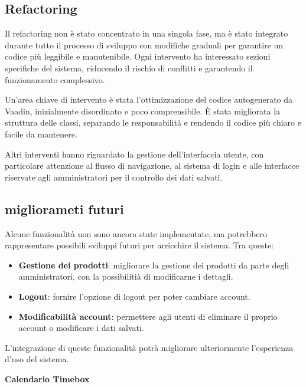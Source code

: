 \documentclass[a4paper,12pt]{article}
\begin{document}
\subsection{Refactoring}
Il refactoring non è stato concentrato in una singola fase, ma è stato integrato durante tutto il processo di sviluppo con modifiche graduali per garantire un codice più leggibile e manutenibile. Ogni intervento ha interessato sezioni specifiche del sistema, riducendo il rischio di conflitti e garantendo il funzionamento complessivo.

Un'area chiave di intervento è stata l'ottimizzazione del codice autogenerato da Vaadin, inizialmente disordinato e poco comprensibile. È stata migliorata la struttura delle classi, separando le responsabilità e rendendo il codice più chiaro e facile da mantenere.

Altri interventi hanno riguardato la gestione dell’interfaccia utente, con particolare attenzione al flusso di navigazione, al sistema di login e alle interfacce riservate agli amministratori per il controllo dei dati salvati.
\subsection{migliorameti futuri}
Alcune funzionalità non sono ancora state implementate, ma potrebbero rappresentare possibili sviluppi futuri per arricchire il sistema. Tra queste:

\begin{itemize}
    \item \textbf{Gestione dei prodotti}: migliorare la gestione dei prodotti da parte degli amministratori, con la possibilitià di modificarne i dettagli.
    \item \textbf{Logout}: fornire l'opzione di logout per poter cambiare account.
    \item \textbf{Modificabilità account}: permettere agli utenti di eliminare il proprio account o modificare i dati salvati.
\end{itemize}
L'integrazione di queste funzionalità potrà migliorare ulteriormente l'esperienza d'uso del sistema.
\newpage
\begin{center}
\Huge \textbf{Calendario Timebox}
\end{center}
\end{document}
